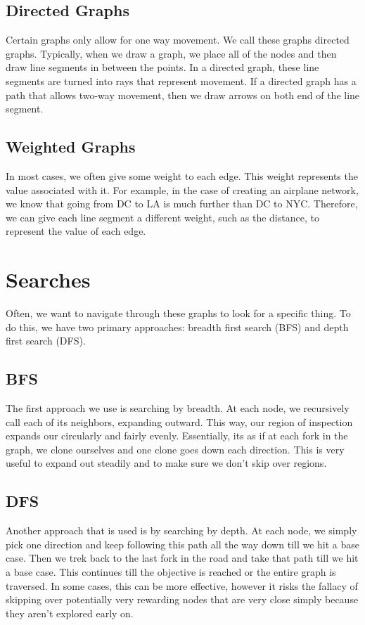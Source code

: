 \documentclass{article}
\begin{document}
\subsection{Directed Graphs}
Certain graphs only allow for one way movement.
We call these graphs directed graphs.
Typically, when we draw a graph, we place all of the nodes and then
draw line segments in between the points. In a directed graph,
these line segments are turned into rays that represent movement.
If a directed graph has a path that allows two-way movement,
then we draw arrows on both end of the line segment.

\subsection{Weighted Graphs}
In most cases, we often give some weight to each edge.
This weight represents the value associated with it.
For example, in the case of creating an airplane network,
we know that going from DC to LA is much further than DC to NYC.
Therefore, we can give each line segment a different weight,
such as the distance, to represent the value of each edge.

\section{Searches}
Often, we want to navigate through these graphs to look for a specific thing.
To do this, we have two primary approaches:
breadth first search (BFS) and depth first search (DFS).

\subsection{BFS}
The first approach we use is searching by breadth.
At each node, we recursively call each of its neighbors, expanding outward.
This way, our region of inspection expands our circularly and fairly evenly.
Essentially, its as if at each fork in the graph, we clone ourselves
and one clone goes down each direction. This is very useful to expand out
steadily and to make sure we don't skip over regions.

\subsection{DFS}
Another approach that is used is by searching by depth.
At each node, we simply pick one direction and keep following this path
all the way down till we hit a base case. Then we trek back to the last fork in
the road and take that path till we hit a base case.
This continues till the objective is reached or the entire graph is traversed.
In some cases, this can be more effective,
however it risks the fallacy of skipping over potentially very rewarding nodes
that are very close simply because they aren't explored early on.
\end{document}
